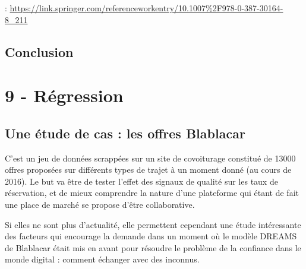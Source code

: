 \documentclass[
]{book}
\begin{document}
: \url{https://link.springer.com/referenceworkentry/10.1007\%2F978-0-387-30164-8_211}

\hypertarget{conclusion}{%
\section{Conclusion}\label{conclusion}}

\hypertarget{ruxe9gression}{%
\chapter{9 - Régression}\label{ruxe9gression}}

\hypertarget{une-uxe9tude-de-cas-les-offres-blablacar}{%
\section{Une étude de cas : les offres Blablacar}\label{une-uxe9tude-de-cas-les-offres-blablacar}}

C'est un jeu de données scrappées sur un site de covoiturage constitué de 13000 offres proposées sur différents types de trajet à un moment donné (au cours de 2016). Le but va être de tester l'effet des signaux de qualité sur les taux de réservation, et de mieux comprendre la nature d'une plateforme qui étant de fait une place de marché se propose d'être collaborative.

Si elles ne sont plus d'actualité, elle permettent cependant une étude intéressante des facteurs qui encourage la demande dans un moment où le modèle DREAMS de Blablacar était mis en avant pour résoudre le problème de la confiance dans le monde digital : comment échanger avec des inconnus.
\end{document}
